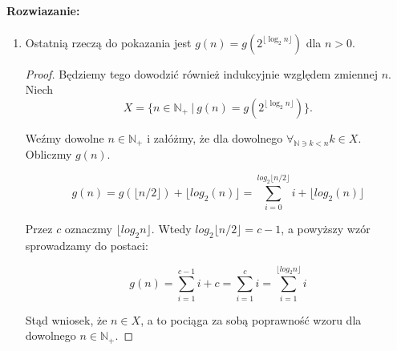 \documentclass{article}
\newenvironment{rozw}{\paragraph{Rozwiazanie:}}{\hfill}
\begin{document}
\begin{rozw}
\begin{itemize}
\begin{enumerate}
\begin{proof}
Weźmy dowolne $n \in \mathbb{N}$ i załóżmy, że $n \in X$. Pokażmy, że $n+1 \in X$.

$$g(2^{n+1}) = g(2^n) + \log_2 2^{n+1} = \left( 0 + 1 + 2 + \ldots + n \right) + (n+1) = \sum_{i=0}^{n+1} i$$

Zatem $(n+1) \in X$. Na mocy zasady indukcji wzór $g(2^n) = \sum_{i=0}^n i$ jest prawdziwy dla dowolnego naturalnego $n$.
\end{proof}

\item Ostatnią rzeczą do pokazania jest $g(n) = g\left( 2^{\lfloor \log_2{n} \rfloor} \right)$ dla $n > 0$.

\begin{proof}
Będziemy tego dowodzić również indukcyjnie względem zmiennej $n$. Niech $$X = \lbrace n \in \mathbb{N}_+ \ | \ g(n) = g\left( 2^{\lfloor \log_2{n} \rfloor} \right) \rbrace.$$

Weźmy dowolne $n \in \mathbb{N}_+$ i załóżmy, że dla dowolnego $\forall_{\mathbb{N} \ni k < n} k \in X$. Obliczmy $g(n)$.

$$
g(n) = g\left( \lfloor n/2 \rfloor \right) + \lfloor log_{2}(n) \rfloor = \sum_{i=0}^{log_2{\lfloor n/2 \rfloor}} i + \lfloor log_{2}(n) \rfloor
$$

Przez $c$ oznaczmy $\lfloor log_2{n} \rfloor$. Wtedy $log_2{\lfloor n/2 \rfloor} = c-1$, a powyższy wzór sprowadzamy do postaci:

$$g(n) = \sum_{i=1}^{c-1} i + c = \sum_{i=1}^{c} i = \sum_{i=1}^{\lfloor log_2{n} \rfloor} i$$

Stąd wniosek, że $n \in X$, a to pociąga za sobą poprawność wzoru dla dowolnego $n \in \mathbb{N}_+$.

 
\end{proof}


\end{enumerate}

\end{itemize}

\end{rozw}

\end{document}
